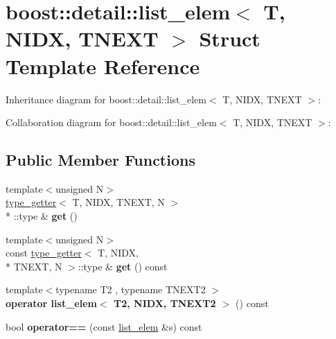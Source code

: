 \hypertarget{structboost_1_1detail_1_1list__elem}{\section{boost\+:\+:detail\+:\+:list\+\_\+elem$<$ T, N\+I\+D\+X, T\+N\+E\+X\+T $>$ Struct Template Reference}
\label{structboost_1_1detail_1_1list__elem}
}


Inheritance diagram for boost\+:\+:detail\+:\+:list\+\_\+elem$<$ T, N\+I\+D\+X, T\+N\+E\+X\+T $>$\+:


Collaboration diagram for boost\+:\+:detail\+:\+:list\+\_\+elem$<$ T, N\+I\+D\+X, T\+N\+E\+X\+T $>$\+:
\subsection*{Public Member Functions}
\begin{DoxyCompactItemize}
\item 
\hypertarget{structboost_1_1detail_1_1list__elem_aa6f65308714a963502f97b6e6365edf7}{{\footnotesize template$<$unsigned N$>$ }\\\hyperlink{structboost_1_1detail_1_1type__getter}{type\+\_\+getter}$<$ T, N\+I\+D\+X, T\+N\+E\+X\+T, N $>$\\*
\+::type \& {\bfseries get} ()}\label{structboost_1_1detail_1_1list__elem_aa6f65308714a963502f97b6e6365edf7}

\item 
\hypertarget{structboost_1_1detail_1_1list__elem_a7f8ecd0a109f342b8fe02328608b59e9}{{\footnotesize template$<$unsigned N$>$ }\\const \hyperlink{structboost_1_1detail_1_1type__getter}{type\+\_\+getter}$<$ T, N\+I\+D\+X, \\*
T\+N\+E\+X\+T, N $>$\+::type \& {\bfseries get} () const }\label{structboost_1_1detail_1_1list__elem_a7f8ecd0a109f342b8fe02328608b59e9}

\item 
\hypertarget{structboost_1_1detail_1_1list__elem_a34ebd497706ac7af96eb4f050accfdd0}{{\footnotesize template$<$typename T2 , typename T\+N\+E\+X\+T2 $>$ }\\{\bfseries operator list\+\_\+elem$<$ T2, N\+I\+D\+X, T\+N\+E\+X\+T2 $>$} () const }\label{structboost_1_1detail_1_1list__elem_a34ebd497706ac7af96eb4f050accfdd0}

\item 
\hypertarget{structboost_1_1detail_1_1list__elem_a90f93acf8ea3aa9f677a8c7e087f29d0}{bool {\bfseries operator==} (const \hyperlink{structboost_1_1detail_1_1list__elem}{list\+\_\+elem} \&s) const }\label{structboost_1_1detail_1_1list__elem_a90f93acf8ea3aa9f677a8c7e087f29d0}

\end{DoxyCompactItemize}
